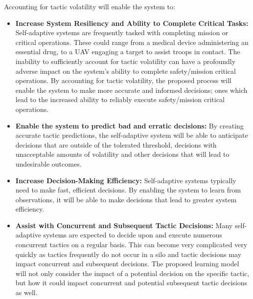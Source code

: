 \documentclass[12pt]{article}
\begin{document}
Accounting for tactic volatility will enable the system to:


\begin{itemize}[noitemsep]

    
    
    
    \item \textbf{Increase System Resiliency and Ability to Complete Critical Tasks: } Self-adaptive systems are frequently tasked with completing mission or critical operations. These could range from a medical device administering an essential drug, to a UAV engaging a target to assist troops in contact. The inability to sufficiently account for tactic volatility can have a profoundly adverse impact on the system's ability to complete safety/mission critical operations. By accounting for tactic volatility, the proposed process will enable the system to make more accurate and informed decisions; ones which lead to the increased ability to reliably execute safety/mission critical operations. 
    
    \item \textbf{Enable the system to predict bad and erratic decisions: }By creating accurate tactic predictions, the self-adaptive system will be able to anticipate decisions that are outside of the tolerated threshold, decisions with unacceptable amounts of volatility and other decisions that will lead to undesirable outcomes. 

    \item \textbf{Increase Decision-Making Efficiency: }Self-adaptive systems typically need to make fast, efficient decisions. By enabling the system to learn from observations, it will be able to make decisions that lead to greater system efficiency.

    \item \textbf{Assist with Concurrent and Subsequent Tactic Decisions: } Many self-adaptive systems are expected to decide upon and execute numerous concurrent tactics on a regular basis. This can become very complicated very quickly as tactics frequently do not occur in a silo and tactic decisions may impact concurrent and subsequent decisions. The proposed learning model will not only consider the impact of a potential decision on the specific tactic, but how it could impact concurrent and potential subsequent tactic decisions as well. 
    
    
\end{itemize}
\end{document}

